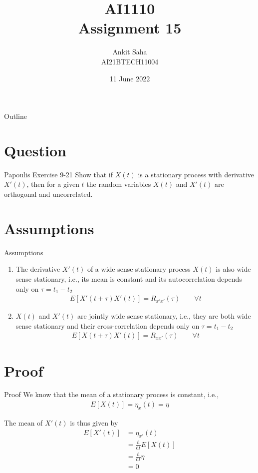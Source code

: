 \documentclass{beamer}
\title{AI1110 \\ Assignment 15}
\author{Ankit Saha \\ AI21BTECH11004}
\date{11 June 2022}
\providecommand{\mean}[1]{E\left[ #1 \right]}
\begin{document}
	\begin{frame}
		\titlepage
	\end{frame}
	
	\begin{frame}{Outline}
    		\tableofcontents
	\end{frame}
	
	\section{Question}
	\begin{frame}{Papoulis Exercise 9-21}
	Show that if $X(t)$ is a stationary process with derivative $X'(t)$, then for a given $t$ the random variables $X(t)$ and $X'(t)$ are orthogonal and uncorrelated.
	\end{frame}
	
	\section{Assumptions}
	\begin{frame}{Assumptions}
	\begin{enumerate}
		\item The derivative $X'(t)$ of a wide sense stationary process $X(t)$ is also wide sense stationary, i.e., its mean is constant and its autocorrelation depends only on $\tau = t_1 - t_2$
		\begin{align}
			\mean{X'(t+\tau)X'(t)} = R_{x'x'}(\tau) \qquad \forall t
		\end{align}
		
		\item $X(t)$ and $X'(t)$ are jointly wide sense stationary, i.e., they are both wide sense stationary and their cross-correlation depends only on $\tau = t_1 - t_2$
		\begin{align}
			\mean{X(t+\tau)X'(t)} = R_{xx'}(\tau) \qquad \forall t
		\end{align}
	\end{enumerate}
	\end{frame}	
	
	\section{Proof}
	\begin{frame}{Proof}
	We know that the mean of a stationary process is constant, i.e.,
	\begin{align}
		\mean{X(t)} = \eta_{x}(t) = \eta
	\end{align}
	
	The mean of $X'(t)$ is thus given by
	\begin{align}
		\mean{X'(t)} &= \eta_{x'}(t) \\
		&= \frac{\mathrm{d}}{\mathrm{d}t} \mean{X(t)} \\
		&= \frac{\mathrm{d}}{\mathrm{d}t} \eta \\
		&= 0
	\end{align}
	\end{frame}
	
\end{document}
